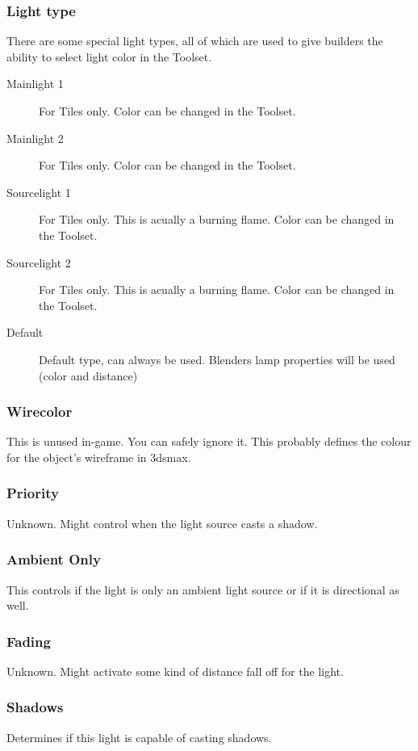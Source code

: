 \subsubsection*{Light type}
There are some special light types, all of which are used to give builders
the ability to select light color in the Toolset.
\begin{description}
    \item[Mainlight 1] For Tiles only. Color can be changed in the Toolset.
    \item[Mainlight 2] For Tiles only. Color can be changed in the Toolset.
    \item[Sourcelight 1] For Tiles only. This is acually a burning flame. Color can be changed in the Toolset.
    \item[Sourcelight 2] For Tiles only. This is acually a burning flame. Color can be changed in the Toolset.
    \item[Default] Default type, can always be used. Blenders lamp properties will be used (color and distance)
\end{description}

\subsubsection*{Wirecolor}
This is unused in-game. You can safely ignore it. This probably defines the
colour for the object's wireframe in 3dsmax.

\subsubsection*{Priority}
Unknown. Might control when the light source casts a shadow.

\subsubsection*{Ambient Only}
This controls if the light is only an ambient light source or
if it is directional as well.

\subsubsection*{Fading}
Unknown. Might activate some kind of distance fall off for the light.

\subsubsection*{Shadows}
Determines if this light is capable of casting shadows.

